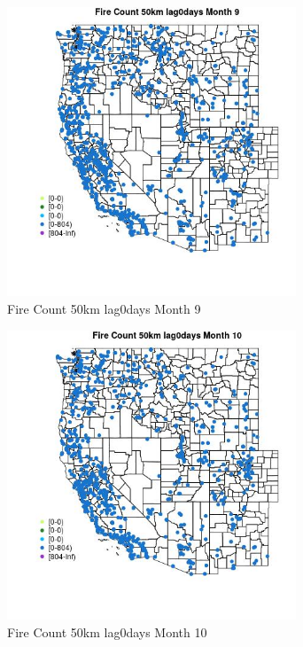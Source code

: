 \begin{figure} 
\centering  
\includegraphics[width=0.77\textwidth]{Code_Outputs/Report_ML_input_PM25_Step4_part_f_de_duplicated_aveswNAs_MapObsMo9Fire_Count_50km_lag0days.jpg} 
\caption{\label{fig:Report_ML_input_PM25_Step4_part_f_de_duplicated_aveswNAsMapObsMo9Fire_Count_50km_lag0days}Fire Count 50km lag0days Month 9} 
\end{figure} 
 

\begin{figure} 
\centering  
\includegraphics[width=0.77\textwidth]{Code_Outputs/Report_ML_input_PM25_Step4_part_f_de_duplicated_aveswNAs_MapObsMo10Fire_Count_50km_lag0days.jpg} 
\caption{\label{fig:Report_ML_input_PM25_Step4_part_f_de_duplicated_aveswNAsMapObsMo10Fire_Count_50km_lag0days}Fire Count 50km lag0days Month 10} 
\end{figure} 
 

